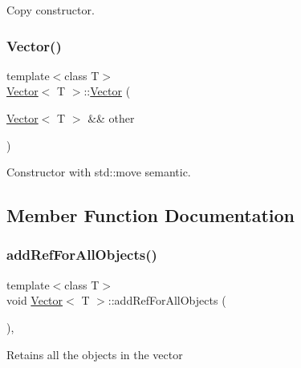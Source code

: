 Copy constructor. \mbox{\label{classVector_a2694f1fd3e904f3d7b9d387cafa1dafe}} 
\subsubsection{\texorpdfstring{Vector()}{Vector()}\hspace{0.1cm}{\footnotesize\ttfamily [10/10]}}
{\footnotesize\ttfamily template$<$class T$>$ \\
\hyperlink{classVector}{Vector}$<$ T $>$\+::\hyperlink{classVector}{Vector} (\begin{DoxyParamCaption}\item[{\hyperlink{classVector}{Vector}$<$ T $>$ \&\&}]{other }\end{DoxyParamCaption})\hspace{0.3cm}{\ttfamily [inline]}}

Constructor with std\+::move semantic. 

\subsection{Member Function Documentation}
\mbox{\label{classVector_a76c1c174d6e074ee27e8717ac8e4df1b}} 
\subsubsection{\texorpdfstring{add\+Ref\+For\+All\+Objects()}{addRefForAllObjects()}\hspace{0.1cm}{\footnotesize\ttfamily [1/2]}}
{\footnotesize\ttfamily template$<$class T$>$ \\
void \hyperlink{classVector}{Vector}$<$ T $>$\+::add\+Ref\+For\+All\+Objects (\begin{DoxyParamCaption}{ }\end{DoxyParamCaption})\hspace{0.3cm}{\ttfamily [inline]}, {\ttfamily [protected]}}

Retains all the objects in the vector \mbox{\label{classVector_a76c1c174d6e074ee27e8717ac8e4df1b}} 
